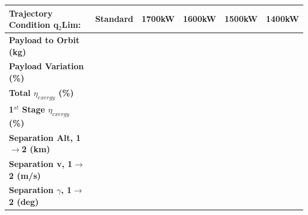 \begin{table}[ht]
	
	\centering
	\begin{tabular}{l c c c c c } 
		\hline \textbf{Trajectory Condition}	q$_2$Lim:
		& Standard
		& 1700kW
		& 1600kW
		& 1500kW
		& 1400kW
		\\
		\hline \textbf{Payload to Orbit (kg)}
		& \textbf{\PayloadToOrbitheatLimStandard}
		& \textbf{\PayloadToOrbitheatLimSeventeenHundred}
		& \textbf{\PayloadToOrbitheatLimSixteenHundred}
		& \textbf{\PayloadToOrbitheatLimFifteenHundred}
		& \textbf{\PayloadToOrbitheatLimFourteenHundred}
		\\
		\textbf{Payload Variation (\%)}
		& \PayloadVarheatLimStandard
		& \PayloadVarheatLimSeventeenHundred
		& \PayloadVarheatLimSixteenHundred
		& \PayloadVarheatLimFifteenHundred
		& \PayloadVarheatLimFourteenHundred
		\\
		\textbf{Total $\eta_{exergy}$ (\%)}
		& \textbf{\totalExergyEffheatLimStandard}
		& \textbf{\totalExergyEffheatLimSeventeenHundred}
		& \textbf{\totalExergyEffheatLimSixteenHundred}
		& \textbf{\totalExergyEffheatLimFifteenHundred}
		& \textbf{\totalExergyEffheatLimFourteenHundred}
		\\
		\hline 
		\textbf{1$^{st}$ Stage $\eta_{exergy}$ (\%)}
		& \textbf{\firstExergyEffheatLimStandard}
		& \textbf{\firstExergyEffheatLimSeventeenHundred}
		& \textbf{\firstExergyEffheatLimSixteenHundred}
		& \textbf{\firstExergyEffheatLimFifteenHundred}
		& \textbf{\firstExergyEffheatLimFourteenHundred}
		\\
		\textbf{Separation Alt, 1$\rightarrow$2 (km)}
		& \firstsecondSeparationAltheatLimStandard
		& \firstsecondSeparationAltheatLimSeventeenHundred
		& \firstsecondSeparationAltheatLimSixteenHundred
		& \firstsecondSeparationAltheatLimFifteenHundred
		& \firstsecondSeparationAltheatLimFourteenHundred
		\\
		\textbf{Separation v, 1$\rightarrow$2 (m/s)}
		& \firstsecondSeparationvheatLimStandard
		& \firstsecondSeparationvheatLimSeventeenHundred
		& \firstsecondSeparationvheatLimSixteenHundred
		& \firstsecondSeparationvheatLimFifteenHundred
		& \firstsecondSeparationvheatLimFourteenHundred
		\\
		\textbf{Separation $\gamma$, 1$\rightarrow$2 (deg)}
		& \firstsecondSeparationgammaheatLimStandard
		& \firstsecondSeparationgammaheatLimSeventeenHundred
		& \firstsecondSeparationgammaheatLimSixteenHundred
		& \firstsecondSeparationgammaheatLimFifteenHundred
		& \firstsecondSeparationgammaheatLimFourteenHundred

\end{tabular}
\end{table}
